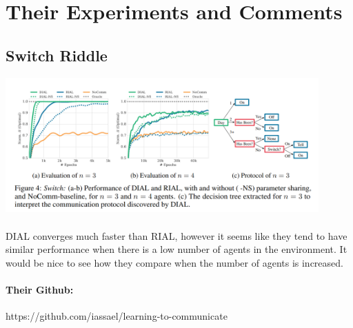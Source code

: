 \documentclass{article}
\begin{document}
    \section{Their Experiments and Comments}

    \subsection{Switch Riddle}
    \includegraphics[width=12cm]{fig4.png}

    \paragraph{} DIAL converges much faster than RIAL, however it seems like they tend to have similar performance when there is a low number of agents in the environment. It would be nice to see how they compare when the number of agents is increased.
    \paragraph{Their Github:} https://github.com/iassael/learning-to-communicate
\end{document}
